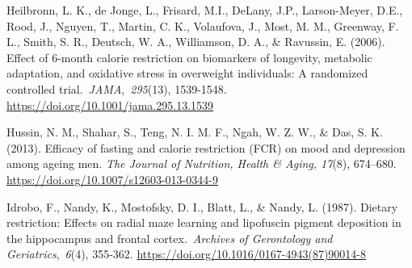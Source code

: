 \documentclass[authordate, empirical,issue]{jote-new-article}
\begin{document}
Heilbronn, L. K., de Jonge, L., Frisard, M.I., DeLany, J.P., Larson-Meyer, D.E., Rood, J., Nguyen, T., Martin, C. K., Volaufova, J., Most, M. M., Greenway, F. L., Smith, S. R., Deutsch, W. A., Williamson, D. A., \& Ravussin, E. (2006). Effect of 6-month calorie restriction on biomarkers of longevity, metabolic adaptation, and oxidative stress in overweight individuals: A randomized controlled trial. \emph{JAMA}, \emph{295}(13), 1539-1548. \url{https://doi.org/10.1001/jama.295.13.1539}









Hussin, N. M., Shahar, S., Teng, N. I. M. F., Ngah, W. Z. W., \& Das, S. K. (2013). Efficacy of fasting and calorie restriction (FCR) on mood and depression among ageing men.\emph{ The Journal of Nutrition, Health \& Aging, 17}(8), 674--680. \url{https://doi.org/10.1007/s12603-013-0344-9}



Idrobo, F., Nandy, K., Mostofsky, D. I., Blatt, L., \& Nandy, L. (1987). Dietary restriction: Effects on radial maze learning and lipofuscin pigment deposition in the hippocampus and frontal cortex. \emph{Archives of Gerontology and Geriatrics}, \emph{6}(4), 355-362. \url{https://doi.org/10.1016/0167-4943(87)90014-8}



\end{document}
